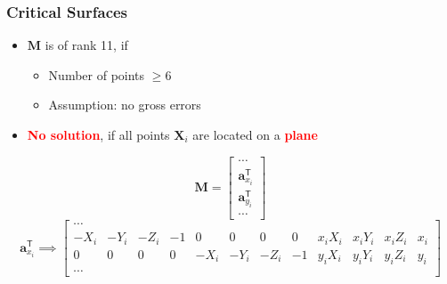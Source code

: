 \begin{frame}
    \frametitle{Critical Surfaces}
    \begin{itemize}
        \item $\mathbf{M}$ is of rank 11, if
        \begin{itemize}
            \item Number of points $\geq 6$
            \item Assumption: no gross errors
        \end{itemize}
        \item \textcolor{red}{\bfseries No solution}, if all points $\mathbf{X}_i$ are located on a \textcolor{red}{\bfseries plane}
    \end{itemize}

    \vspace{0.5cm}
    \centering
    \begin{equation*}
    \mathbf{M} = 
    \begin{bmatrix}
    \cdots \\
    \mathbf{a}_{x_i}^\mathsf{T} \\
    \mathbf{a}_{y_i}^\mathsf{T} \\
    \cdots
    \end{bmatrix}
    \end{equation*}
    \vspace{1cm}
    \begin{equation*}
    \mathbf{a}_{x_i}^\mathsf{T} \implies
    \begin{bmatrix}
        \cdots \\
        -X_i & -Y_i & -Z_i & -1 & 0 & 0 & 0 & 0 & x_i X_i & x_i Y_i & x_i Z_i & x_i \\
        0 & 0 & 0 & 0 & -X_i & -Y_i & -Z_i & -1 & y_i X_i & y_i Y_i & y_i Z_i & y_i \\
        \cdots
    \end{bmatrix}
    \end{equation*}
    \vspace{-1.5cm} %
\end{frame}

